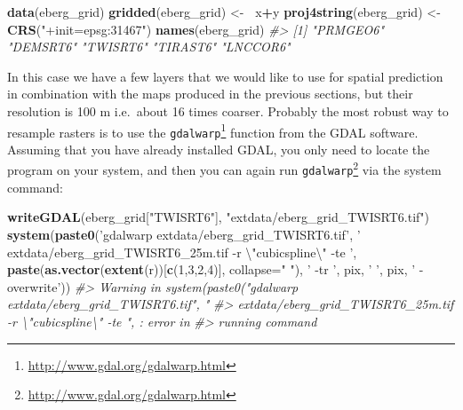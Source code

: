 \documentclass[graybox,natbib,nospthms,UStrade]{svmono}
\newenvironment{Shaded}{\begin{snugshade}}{\end{snugshade}}
\newcommand{\CharTok}[1]{\textcolor[rgb]{0.5,0.5,0.5}{#1}}
\newcommand{\CommentTok}[1]{\textcolor[rgb]{0.37,0.37,0.37}{\textit{#1}}}
\newcommand{\DataTypeTok}[1]{\textcolor[rgb]{0.27,0.27,0.27}{#1}}
\newcommand{\DecValTok}[1]{\textcolor[rgb]{0.06,0.06,0.06}{#1}}
\newcommand{\ErrorTok}[1]{\textcolor[rgb]{0.14,0.14,0.14}{\textbf{#1}}}
\newcommand{\KeywordTok}[1]{\textcolor[rgb]{0.27,0.27,0.27}{\textbf{#1}}}
\newcommand{\NormalTok}[1]{#1}
\newcommand{\OperatorTok}[1]{\textcolor[rgb]{0.43,0.43,0.43}{\textbf{#1}}}
\newcommand{\StringTok}[1]{\textcolor[rgb]{0.5,0.5,0.5}{#1}}
\renewcommand{\href}[2]{#2 (\url{#1})}
\renewcommand{\href}[2]{#2\footnote{\url{#1}}}
\begin{document}
\begin{Shaded}
\begin{Highlighting}[]
\KeywordTok{data}\NormalTok{(eberg_grid)}
\KeywordTok{gridded}\NormalTok{(eberg_grid) <-}\StringTok{ }\ErrorTok{~}\NormalTok{x}\OperatorTok{+}\NormalTok{y}
\KeywordTok{proj4string}\NormalTok{(eberg_grid) <-}\StringTok{ }\KeywordTok{CRS}\NormalTok{(}\StringTok{"+init=epsg:31467"}\NormalTok{)}
\KeywordTok{names}\NormalTok{(eberg_grid)}
\CommentTok{#> [1] "PRMGEO6" "DEMSRT6" "TWISRT6" "TIRAST6" "LNCCOR6"}
\end{Highlighting}
\end{Shaded}

In this case we have a few layers that we would like to use for spatial prediction in combination with the maps produced in the previous sections, but their resolution is 100 m i.e.~about 16 times coarser. Probably the most robust way to resample rasters is to use the \href{http://www.gdal.org/gdalwarp.html}{\texttt{gdalwarp}} function from the GDAL software. Assuming that you have already installed GDAL, you only need to locate the program on your system, and then you can again run \href{http://www.gdal.org/gdalwarp.html}{\texttt{gdalwarp}} via the system command:

\begin{Shaded}
\begin{Highlighting}[]
\KeywordTok{writeGDAL}\NormalTok{(eberg_grid[}\StringTok{"TWISRT6"}\NormalTok{], }\StringTok{"extdata/eberg_grid_TWISRT6.tif"}\NormalTok{)}
\KeywordTok{system}\NormalTok{(}\KeywordTok{paste0}\NormalTok{(}\StringTok{'gdalwarp extdata/eberg_grid_TWISRT6.tif'}\NormalTok{,}
              \StringTok{' extdata/eberg_grid_TWISRT6_25m.tif -r }\CharTok{\textbackslash{}"}\StringTok{cubicspline}\CharTok{\textbackslash{}"}\StringTok{ -te '}\NormalTok{, }
              \KeywordTok{paste}\NormalTok{(}\KeywordTok{as.vector}\NormalTok{(}\KeywordTok{extent}\NormalTok{(r))[}\KeywordTok{c}\NormalTok{(}\DecValTok{1}\NormalTok{,}\DecValTok{3}\NormalTok{,}\DecValTok{2}\NormalTok{,}\DecValTok{4}\NormalTok{)], }\DataTypeTok{collapse=}\StringTok{" "}\NormalTok{),}
              \StringTok{' -tr '}\NormalTok{, pix, }\StringTok{' '}\NormalTok{, pix, }\StringTok{' -overwrite'}\NormalTok{))}
\CommentTok{#> Warning in system(paste0("gdalwarp extdata/eberg_grid_TWISRT6.tif", "}
\CommentTok{#> extdata/eberg_grid_TWISRT6_25m.tif -r \textbackslash{}"cubicspline\textbackslash{}" -te ", : error in}
\CommentTok{#> running command}
\end{Highlighting}
\end{Shaded}
\end{document}
